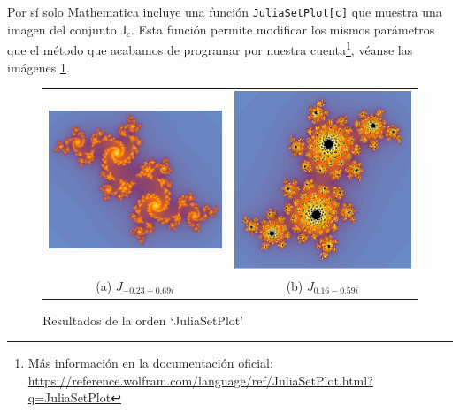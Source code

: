 Por sí solo Mathematica incluye una función \verb|JuliaSetPlot[c]| que muestra una imagen del conjunto $\mathsf{J}_c$. Esta función permite modificar los mismos parámetros que el método que acabamos de programar por nuestra cuenta\footnote{Más información en la documentación oficial: \url{https://reference.wolfram.com/language/ref/JuliaSetPlot.html?q=JuliaSetPlot}}, véanse las imágenes \ref{fig:julia-set-plot}.

\begin{figure}[ht]
  \centering
  \begin{tabular}{cc}
    \includegraphics[scale=0.4]{./img/C3/juliaSetPlot-1.png} &   \includegraphics[scale=0.3]{./img/C3/juliaSetPlot-2.png} \\
  (a) $J_{-0.23+0.69i}$ & (b) $J_{0.16-0.59i}$  \\[6pt]
  \end{tabular}
  \caption{Resultados de la orden `JuliaSetPlot'}
  \label{fig:julia-set-plot}
\end{figure}

